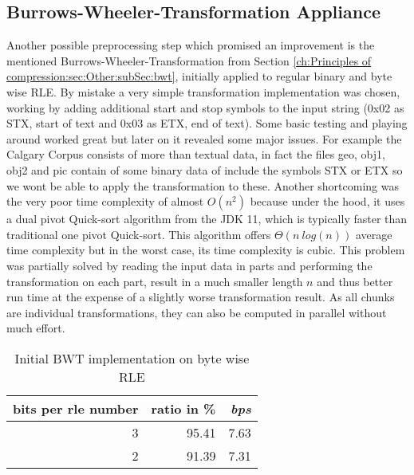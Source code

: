 \subsection{Burrows-Wheeler-Transformation Appliance}
\par{
Another possible preprocessing step which promised an improvement is the mentioned Burrows-Wheeler-Transformation from Section \ref{ch:Principles of compression:sec:Other:subSec:bwt}, initially applied to regular binary and byte wise RLE. By mistake a very simple transformation implementation was chosen, working by adding additional start and stop symbols to the input string (0x02 as STX, start of text and 0x03 as ETX, end of text). Some basic testing and playing around worked great but later on it revealed some major issues. For example the Calgary Corpus consists of more than textual data, in fact the files geo, obj1, obj2 and pic contain of some binary data of include the symbols STX or ETX so we wont be able to apply the transformation to these. Another shortcoming was the very poor time complexity of almost $O (n^2)$ because under the hood, it uses a dual pivot Quick-sort algorithm from the JDK 11, which is typically faster than traditional one pivot Quick-sort. This algorithm offers $\Theta (n \: log(n))$ average time complexity but in the worst case, its time complexity is cubic. This problem was partially solved by reading the input data in parts and performing the transformation on each part, result in a much smaller length $n$ and thus better run time at the expense of a slightly worse transformation result. As all chunks are individual transformations, they can also be computed in parallel without much effort.

\begin{table}[h]
	\centering
	\begin{tabular}{r|r|r}	
		bits per rle number & ratio in \% & \textit{bps}\\
		\hline
		3 & 95.41 & 7.63\\
		2 & 91.39 & 7.31 \\
	\end{tabular}
	\caption{Initial BWT implementation on byte wise RLE}
	\label{tab:t11 Simple Burrows Wheeler Transformation on byte wise RLE}
\end{table}
}
